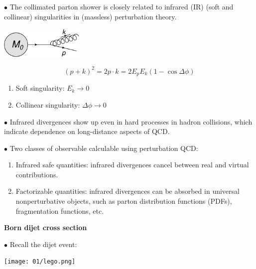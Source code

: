 \documentclass[9pt,a4paper,unknownkeysallowed,xcolor=dvipsnames,aspectratio=43]{beamer}
\begin{document}
\begin{frame}\vspace{2mm}

{\color{darkred}\Large$\bullet$} The collimated parton shower is closely related to {\color{darkred} infrared (IR) (soft and collinear) singularities} in (massless) perturbation theory. 
\vspace{2mm}
\begin{center}
\includegraphics[width=0.3\textwidth]{02/branch.pdf}
\end{center}
$$
(p+k)^2=2 p\cdot k = 2 E_p E_k (1-\cos\Delta \phi)
$$
\begin{enumerate}
    \item {\color{darkred}Soft singularity:} $E_k\to 0$
    \item {\color{darkred}Collinear singularity:} $\Delta\phi\to 0$
\end{enumerate}
\vspace{2mm}

{\color{darkred}\Large$\bullet$} {\color{darkred}Infrared divergences show up even in hard processes} in hadron collisions, which indicate dependence on long-distance aspects of QCD.
\vspace{2mm}

{\color{darkred}\Large$\bullet$} Two classes of observable calculable using perturbation QCD:
\begin{enumerate}
    \item {\color{darkred}Infrared safe quantities:} infrared
divergences cancel between real and virtual contributions.
    \item {\color{darkred}Factorizable quantities:} infrared
divergences can be absorbed in universal nonperturbative objects, such as parton distribution functions (PDFs), fragmentation functions, etc.
\end{enumerate}

\end{frame}
%
%
\begin{frame}{\bf\huge Born dijet cross section}
\vspace{2mm}

{\color{darkred}\Large$\bullet$} Recall the dijet event:
\begin{center}
\texttt{[image: 01/lego.png]}
\end{center}
\end{frame}
\end{document}
